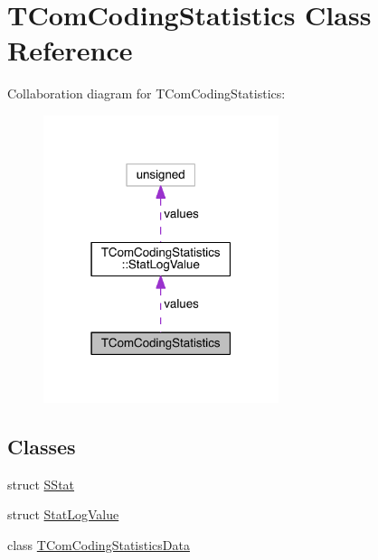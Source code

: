 \hypertarget{class_t_com_coding_statistics}{}\section{T\+Com\+Coding\+Statistics Class Reference}
\label{class_t_com_coding_statistics}


Collaboration diagram for T\+Com\+Coding\+Statistics\+:
\nopagebreak
\begin{figure}[H]
\begin{center}
\leavevmode
\includegraphics[width=195pt]{d2/d42/class_t_com_coding_statistics__coll__graph}
\end{center}
\end{figure}
\subsection*{Classes}
\begin{DoxyCompactItemize}
\item 
struct \hyperlink{struct_t_com_coding_statistics_1_1_s_stat}{S\+Stat}
\item 
struct \hyperlink{struct_t_com_coding_statistics_1_1_stat_log_value}{Stat\+Log\+Value}
\item 
class \hyperlink{class_t_com_coding_statistics_1_1_t_com_coding_statistics_data}{T\+Com\+Coding\+Statistics\+Data}
\end{DoxyCompactItemize}
